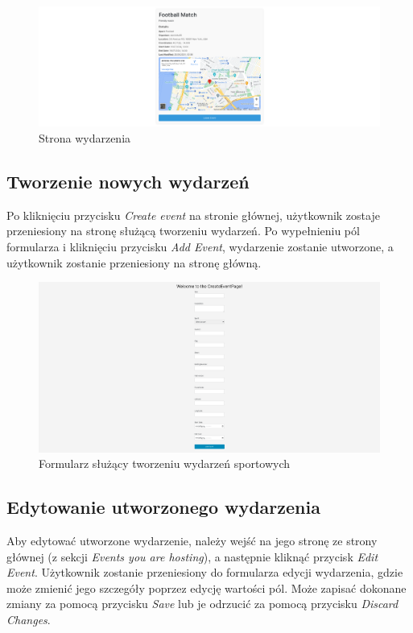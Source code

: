 \documentclass[11pt,a4paper]{article}
\begin{document}
\begin{figure} [H]
    \centering
    \includegraphics[width=1\linewidth]{pages/event_leave.png}
    \caption{Strona wydarzenia}
\end{figure}

\subsection{Tworzenie nowych wydarzeń}

Po kliknięciu przycisku \textit{Create event} na stronie głównej, użytkownik zostaje przeniesiony na stronę służącą tworzeniu wydarzeń. Po wypełnieniu pól formularza i kliknięciu przycisku \textit{Add Event}, wydarzenie zostanie utworzone, a użytkownik zostanie przeniesiony na stronę główną.

\begin{figure} [H]
    \centering
    \includegraphics[width=1\linewidth]{pages/create_event.png}
    \caption{Formularz służący tworzeniu wydarzeń sportowych}
\end{figure}

\subsection{Edytowanie utworzonego wydarzenia}

Aby edytować utworzone wydarzenie, należy wejść na jego stronę ze strony głównej (z sekcji \textit{Events you are hosting}), a następnie kliknąć przycisk \textit{Edit Event}. Użytkownik zostanie przeniesiony do formularza edycji wydarzenia, gdzie może zmienić jego szczegóły poprzez edycję wartości pól. Może zapisać dokonane zmiany za pomocą przycisku \textit{Save} lub je odrzucić za pomocą przycisku \textit{Discard Changes}.
\end{document}

